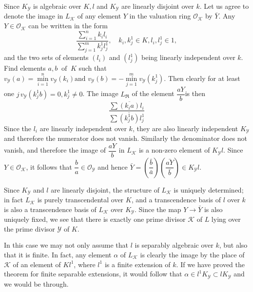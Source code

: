 \setcounter{Case}{0}
\begin{Case}%
  Since $K_\mathscr{Y}$ is algebraic over $K, l$ and $K_\mathscr{Y}$
  are linearly disjoint over $k$. Let us agree to denote the image in
  $L_\mathscr{K}$ of any element $Y$ in the valuation ring
  $\mathscr{O}_\mathscr{K}$ by $\bar{Y}$. Any $Y \in
  \mathscr{O}_\mathscr{K}$ can be written in the form  
  $$
  \frac{\sum\limits_{i=1}^n k_i l_i}{\sum\limits_{j=1}^m k^1_j l^1_j}
  ,\quad  k_i, k^1_j \in K, l_i, l^1_j \in 1, 
  $$ 
  and the two sets of elements $(l_i)$ and $(l^1_j)$ being linearly
  independent over $k$. Find elements $a, b ~\text{ of }~ K$ such that
  $v_\mathscr{Y} (a) = \min\limits_{i=1}^n v_\mathscr{Y} (k_i) \text{
    and } v_\mathscr{Y} (b) = -\min\limits_{j=1}^m v_\mathscr{Y}
  (k^1_j)$. Then clearly for at least one $j\, v_\mathscr{Y}  (k_j^1 b)
  = 0, k^1_j \neq 0$. The image $L_{\mathfrak{R}}$ of the element
  $\dfrac{aY}{b}$\pageoriginale is then   
  $$
  \frac{\sum \overline{(k_i a)} l_i}{\sum \overline{(k^1_j b)} l^1_j}
  $$
  Since the $l_i$ are linearly independent over $k$, they are also
  linearly independent $K_\mathscr{Y}$ and therefore the numerator
  does not vanish. Similarly the denominator does not vanish, and
  therefore the image of $\dfrac{aY}{b}$ in $L_{\mathscr{K}}$ is a
  non-zero element of $K_\mathscr{Y} l$. Since $Y \in
  \mathscr{O}_\mathscr{K}$, it follows that $\dfrac{b}{a} \in
  \mathscr{O}_\mathscr{Y}$ and hence $\bar{Y} = \left(\dfrac{\bar b}{\bar{
  a}}\right) \left(\dfrac{\bar{aY}}{\bar b}\right) \in K_\mathscr{Y} l$.     
\end{Case}

Since $K_\mathscr{Y}$ and $l$ are linearly disjoint, the structure of
$L_\mathscr{K}$ is uniquely determined; in fact $L_\mathscr{K}$ is
purely transcendental over $K$, and a transcendence basis of $l$ over
$k$ is also a transcendence basis of $L_\mathscr{K}$ over
$K_\mathscr{Y}$. Since the map $Y\to \bar{Y}$ is also uniquely fixed,
we see that there is exactly one prime divisor $\mathscr{K}$ of $L$
lying over the prime divisor $\mathscr{Y}$ of $K$.  

\begin{Case}%
  In this case we may not only assume that $l$ is separably algebraic
  over $k$, but also that it is finite. In fact, any element $\alpha$
  of $L_\mathscr{K}$ is clearly the image by the place of
  $\mathscr{K}$ of an element of $Kl^1$, where $l^1$ is a finite
  extension of $k$. If we have proved the theorem for finite separable
  extensions, it would follow that $\alpha \in l^1
  K_\mathscr{Y} \subset lK_\mathscr{Y}$ and we would be through.   
\end{Case}


